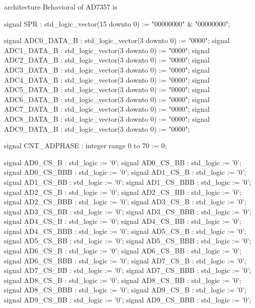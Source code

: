 \begin{mylisting}[language=VHDL,caption=AD変換モジュール,label=appF_ADC_module_VHDL]
architecture Behavioral of AD7357 is

	signal SPR				: std_logic_vector(15 downto 0)		:= "00000000" & "00000000";

	signal ADC0_DATA_B		: std_logic_vector(3 downto 0)		:= "0000";
	signal ADC1_DATA_B		: std_logic_vector(3 downto 0)		:= "0000";
	signal ADC2_DATA_B		: std_logic_vector(3 downto 0)		:= "0000";
	signal ADC3_DATA_B		: std_logic_vector(3 downto 0)		:= "0000";
	signal ADC4_DATA_B		: std_logic_vector(3 downto 0)		:= "0000";
	signal ADC5_DATA_B		: std_logic_vector(3 downto 0)		:= "0000";
	signal ADC6_DATA_B		: std_logic_vector(3 downto 0)		:= "0000";
	signal ADC7_DATA_B		: std_logic_vector(3 downto 0)		:= "0000";
	signal ADC8_DATA_B		: std_logic_vector(3 downto 0)		:= "0000";
	signal ADC9_DATA_B		: std_logic_vector(3 downto 0)		:= "0000";

	signal CNT_ADPHASE		: integer range 0 to 70				:= 0;

	signal AD0_CS_B			: std_logic							:= '0';
	signal AD0_CS_BB		: std_logic							:= '0';
	signal AD0_CS_BBB		: std_logic							:= '0';
	signal AD1_CS_B			: std_logic							:= '0';
	signal AD1_CS_BB		: std_logic							:= '0';
	signal AD1_CS_BBB		: std_logic							:= '0';
	signal AD2_CS_B			: std_logic							:= '0';
	signal AD2_CS_BB		: std_logic							:= '0';
	signal AD2_CS_BBB		: std_logic							:= '0';
	signal AD3_CS_B			: std_logic							:= '0';
	signal AD3_CS_BB		: std_logic							:= '0';
	signal AD3_CS_BBB		: std_logic							:= '0';
	signal AD4_CS_B			: std_logic							:= '0';
	signal AD4_CS_BB		: std_logic							:= '0';
	signal AD4_CS_BBB		: std_logic							:= '0';
	signal AD5_CS_B			: std_logic							:= '0';
	signal AD5_CS_BB		: std_logic							:= '0';
	signal AD5_CS_BBB		: std_logic							:= '0';
	signal AD6_CS_B			: std_logic							:= '0';
	signal AD6_CS_BB		: std_logic							:= '0';
	signal AD6_CS_BBB		: std_logic							:= '0';
	signal AD7_CS_B			: std_logic							:= '0';
	signal AD7_CS_BB		: std_logic							:= '0';
	signal AD7_CS_BBB		: std_logic							:= '0';
	signal AD8_CS_B			: std_logic							:= '0';
	signal AD8_CS_BB		: std_logic							:= '0';
	signal AD8_CS_BBB		: std_logic							:= '0';
	signal AD9_CS_B			: std_logic							:= '0';
	signal AD9_CS_BB		: std_logic							:= '0';
	signal AD9_CS_BBB		: std_logic							:= '0';


\end{mylisting}
